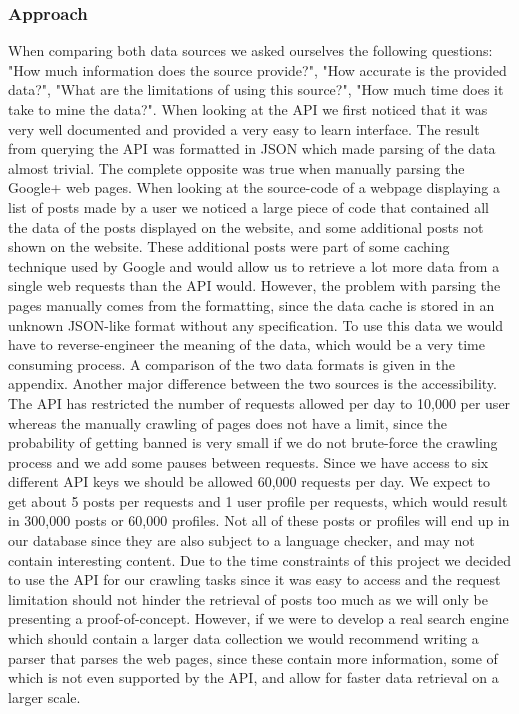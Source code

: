 \subsubsection*{Approach}
When comparing both data sources we asked ourselves the following questions: "How much information does the source provide?", "How accurate is the provided data?", "What are the limitations of using this source?", "How much time does it take to mine the data?". When looking at the API we first noticed that it was very well documented and provided a very easy to learn interface. The result from querying the API was formatted in JSON which made parsing of the data almost trivial. The complete opposite was true when manually parsing the Google+ web pages. When looking at the source-code of a webpage displaying a list of posts made by a user we noticed a large piece of code that contained all the data of the posts displayed on the website, and some additional posts not shown on the website. These additional posts were part of some caching technique used by Google and would allow us to retrieve a lot more data from a single web requests than the API would. However, the problem with parsing the pages manually comes from the formatting, since the data cache is stored in an unknown JSON-like format without any specification. To use this data we would have to reverse-engineer the meaning of the data, which would be a very time consuming process. A comparison of the two data formats is given in the appendix.
Another major difference between the two sources is the accessibility. The API has restricted the number of requests allowed per day to 10,000 per user whereas the manually crawling of pages does not have a limit, since the probability of getting banned is very small if we do not brute-force the crawling process and we add some pauses between requests. Since we have access to six different API keys we should be allowed 60,000 requests per day. We expect to get about 5 posts per requests and 1 user profile per requests, which would result in 300,000 posts or 60,000 profiles. Not all of these posts or profiles will end up in our database since they are also subject to a language checker, and may not contain interesting content.
Due to the time constraints of this project we decided to use the API for our crawling tasks since it was easy to access and the request limitation should not hinder the retrieval of posts too much as we will only be presenting a proof-of-concept. However, if we were to develop a real search engine which should contain a larger data collection we would recommend writing a parser that parses the web pages, since these contain more information, some of which is not even supported by the API, and allow for faster data retrieval on a larger scale.

